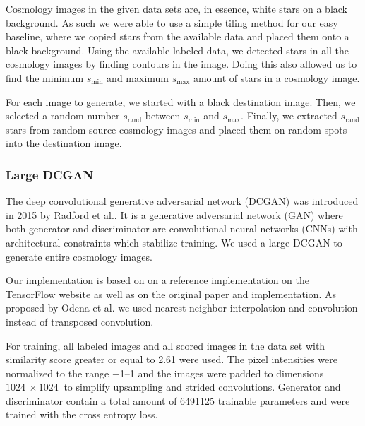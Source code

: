 \documentclass[10pt,conference,compsocconf]{IEEEtran}
\begin{document}

Cosmology images in the given data sets are, in essence, white stars on a black background. As such we were able to use a simple tiling method for our easy baseline, where we copied stars from the available data and placed them onto a black background. Using the available labeled data, we detected stars in all the cosmology images by finding contours in the image. Doing this also allowed us to find the minimum $s_{\text{min}}$ and maximum $s_{\text{max}}$ amount of stars in a cosmology image.

For each image to generate, we started with a black destination image. Then, we selected a random number $s_{\text{rand}}$ between $s_{\text{min}}$ and $s_{\text{max}}$. Finally, we extracted $s_{\text{rand}}$ stars from random source cosmology images and placed them on random spots into the destination image.

\subsubsection{Large DCGAN}

The deep convolutional generative adversarial network (DCGAN) was introduced in 2015 by Radford et al.\@ \cite{Radford}. It is a generative adversarial network (GAN) where both generator and discriminator are convolutional neural networks (CNNs) with architectural constraints which stabilize training. We used a large DCGAN to generate entire cosmology images. 

Our implementation is based on on a reference implementation on the TensorFlow website \cite{dcgantf} as well as on the original paper and implementation. As proposed by Odena et al.\@ \cite{Odena} we used nearest neighbor interpolation and convolution instead of transposed convolution.

For training, all labeled images and all scored images in the data set with similarity score greater or equal to \SI{2.61}{} were used. The pixel intensities were normalized to the range \SIrange{-1}{1}{} and the images were padded to dimensions $\SI{1024}{}\times\SI{1024}{}$ to simplify upsampling and strided convolutions. Generator and discriminator contain a total amount of \SI{6491125}{} trainable parameters and were trained with the cross entropy loss.
\end{document}
